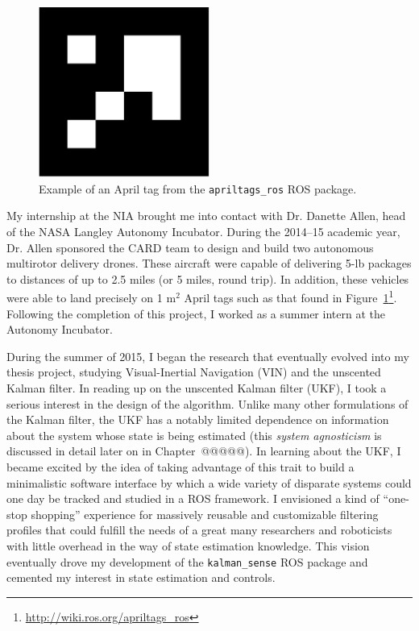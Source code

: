 \begin{figure}
  \centering
    \includegraphics[width=0.5\textwidth]{april_tag}
  \caption[Example April tag]{Example of an April tag from the \texttt{apriltags\_ros} ROS package.}
  \label{fig:april_tag}
\end{figure}

My internship at the NIA brought me into contact with Dr. Danette Allen, head of the NASA Langley Autonomy Incubator. During the 2014--15 academic year, Dr. Allen sponsored the CARD team to design and build two autonomous multirotor delivery drones. These aircraft were capable of delivering 5-lb packages to distances of up to 2.5 miles (or 5 miles, round trip). In addition, these vehicles were able to land precisely on 1 m$^2$ April tags such as that found in Figure~\ref{fig:april_tag}\footnote{\url{http://wiki.ros.org/apriltags\_ros}}. Following the completion of this project, I worked as a summer intern at the Autonomy Incubator.

During the summer of 2015, I began the research that eventually evolved into my thesis project, studying Visual-Inertial Navigation (VIN) and the unscented Kalman filter. In reading up on the unscented Kalman filter (UKF), I took a serious interest in the design of the algorithm. Unlike many other formulations of the Kalman filter, the UKF has a notably limited dependence on information about the system whose state is being estimated (this \textit{system agnosticism} is discussed in detail later on in {\color{red}Chapter~@@@@@}). In learning about the UKF, I became excited by the idea of taking advantage of this trait to build a minimalistic software interface by which a wide variety of disparate systems could one day be tracked and studied in a ROS framework. I envisioned a kind of ``one-stop shopping'' experience for massively reusable and customizable filtering profiles that could fulfill the needs of a great many researchers and roboticists with little overhead in the way of state estimation knowledge. This vision eventually drove my development of the \texttt{kalman\_sense} ROS package and cemented my interest in state estimation and controls.

